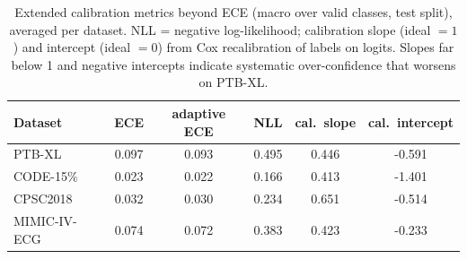 \begin{table}[t]
\centering
\caption{Extended calibration metrics beyond ECE (macro over valid classes, test split), averaged per dataset. NLL = negative log-likelihood; calibration slope (ideal $=1$) and intercept (ideal $=0$) from Cox recalibration of labels on logits. Slopes far below 1 and negative intercepts indicate systematic over-confidence that worsens on PTB-XL.}
\label{tab:extended-metrics}
\small
\begin{tabular}{lccccc}
\toprule
Dataset & ECE & adaptive ECE & NLL & cal.\ slope & cal.\ intercept \\
\midrule
  PTB-XL & 0.097 & 0.093 & 0.495 & 0.446 & -0.591 \\
  CODE-15\% & 0.023 & 0.022 & 0.166 & 0.413 & -1.401 \\
  CPSC2018 & 0.032 & 0.030 & 0.234 & 0.651 & -0.514 \\
  MIMIC-IV-ECG & 0.074 & 0.072 & 0.383 & 0.423 & -0.233 \\
\bottomrule
\end{tabular}
\end{table}